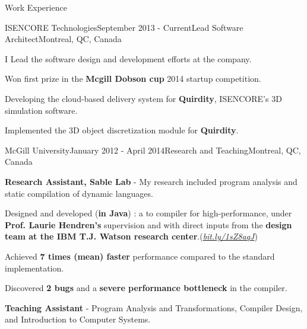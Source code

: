 \documentclass{resume} %
\begin{document}
\begin{rSection}{Work Experience}

\begin{rSubsection}{ISENCORE Technologies}{September 2013 - Current}{Lead
  Software Architect}{Montreal, QC, Canada}
\item I Lead the software design and development efforts at the company.
\end{rSubsection}

\begin{lsubSubsection}
\item Won first prize in the \textbf{Mcgill Dobson cup} 2014 startup competition. 
\item Developing the cloud-based delivery system for \textbf{Quirdity},
  ISENCORE's 3D simulation software.
\item Implemented the 3D object discretization module for \textbf{Quirdity}.
\end{lsubSubsection}

\begin{rSubsection}{McGill University}{January 2012 - April 2014}{Research and
Teaching}{Montreal, QC, Canada} 
\item \textbf{Research Assistant, Sable Lab} - My research included program
analysis and static compilation of dynamic languages.

\begin{lsubSubsection}
  \item Designed and developed (\textbf{in Java}) \mixtenx: a {\matlab to
\xten compiler for high-performance}, under \textbf{Prof.
Laurie Hendren's} supervision and with direct inputs from the \textbf{\xten
design team at the IBM T.J. Watson research
center}.(\href{http://bit.ly/1sZ8aqJ}{\em{bit.ly/1sZ8aqJ}})  
 \item Achieved \textbf{7 times (mean) faster} performance compared to the
 standard \matlab implementation.
  \item Discovered \textbf{2 bugs} and a \textbf{severe performance bottleneck}
in the \xten compiler.  
\end{lsubSubsection}
\item \textbf{Teaching Assistant} - Program Analysis and Transformations,
	Compiler Design, and Introduction to Computer Systems.
\end{rSubsection}


\end{rSection}
\end{document}
